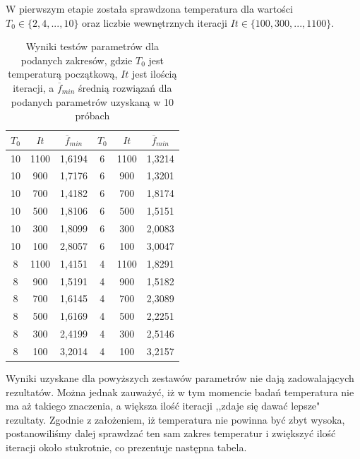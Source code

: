 \documentclass[twoside]{projektInzynierskiMS1}
\newcommand{\si}{ś}
\begin{document}
W pierwszym etapie została sprawdzona temperatura dla warto\si ci $ T_0 \in \{2, 4, ..., 10\}$ oraz liczbie wewnętrznych iteracji $It \in \{100, 300, ..., 1100\}$. \\
\begin{table}[htbp]\centering
\def\sym#1{\ifmmode^{#1}\else\(^{#1}\)\fi}
\caption{Wyniki testów parametrów dla podanych zakresów, gdzie $T_0$ jest temperaturą początkową, $It$ jest ilo\si cią iteracji, a $\overline{f}_{min}$ \si rednią rozwiązań dla podanych parametrów uzyskaną w 10 próbach}
\renewcommand\arraystretch{1.333}
\begin{tabular}{|c|c|c||c|c|c|} 
                  \hline
                  $T_0$
                  & $It$
                  & $\overline{f}_{min}$ 
& $T_0$
 & $It$
 & $\overline{f}_{min}$ \\ \hline

10 & 1100 & 1,6194 &6 & 1100 & 1,3214 \\ \hline 
10 & 900 & 1,7176 &6 & 900 & 1,3201 \\ \hline 
10 & 700 & 1,4182&6 & 700 & 1,8174 \\ \hline 
10 & 500 & 1,8106&6 & 500 & 1,5151 \\ \hline 
10 & 300 & 1,8099 &6 & 300 & 2,0083 \\ \hline 
10 & 100 & 2,8057&6 & 100 & 3,0047 \\ \Xhline{3\arrayrulewidth}

8 & 1100 & 1,4151 &4 & 1100 & 1,8291 \\ \hline
8 & 900 & 1,5191 & 4 & 900 & 1,5182 \\ \hline
8 & 700 & 1,6145 &4 & 700 & 2,3089 \\ \hline
8 & 500 & 1,6169 &4 & 500 & 2,2251 \\ \hline
8 & 300 & 2,4199 &4 & 300 & 2,5146 \\ \hline 
8 & 100 & 3,2014 &4 & 100 & 3,2157 \\ \hline 


\end{tabular}
\end{table}

Wyniki uzyskane dla powyższych zestawów parametrów nie dają zadowalających rezultatów. Można jednak zauważyć, iż w tym momencie badań temperatura nie ma aż takiego znaczenia, a większa ilo\si ć iteracji ,,zdaje się dawać lepsze" rezultaty. Zgodnie z założeniem, iż temperatura nie powinna być zbyt wysoka, postanowili\si my dalej sprawdzać ten sam zakres temperatur i zwiększyć ilo\si ć iteracji około stukrotnie, co prezentuje następna tabela.
\end{document}

